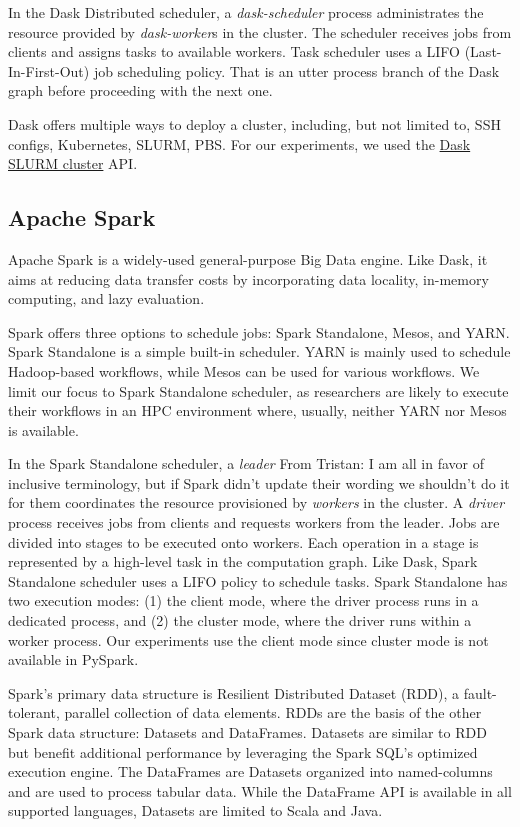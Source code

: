 \documentclass[conference]{IEEEtran}
\newcommand{\TG}[1]{\color{cyan}From Tristan: #1 \color{black}}
\begin{document}
In the Dask Distributed scheduler, a \textit{dask-scheduler} process administrates the resource provided by  \textit{dask-worker}s in the cluster.
The scheduler receives jobs from clients and assigns tasks to available workers.
Task scheduler uses a LIFO (Last-In-First-Out) job scheduling policy.
That is an utter process branch of the Dask graph before proceeding with the next one.

Dask offers multiple ways to deploy a cluster, including, but not limited to, SSH configs, Kubernetes, SLURM, PBS.
For our experiments, we used the \href{https://jobqueue.dask.org/en/latest/generated/dask_jobqueue.SLURMCluster.html}{Dask SLURM cluster} API.

\subsection{Apache Spark}
Apache Spark is a widely-used general-purpose Big Data engine.
Like Dask, it aims at reducing data transfer costs by incorporating data locality, in-memory computing, and lazy evaluation.

Spark offers three options to schedule jobs: Spark Standalone, Mesos, and YARN.
Spark Standalone is a simple built-in scheduler.
YARN is mainly used to schedule Hadoop-based workflows, while Mesos can be used for various workflows.
We limit our focus to Spark Standalone scheduler, as researchers are likely to execute their workflows in an HPC environment where, usually, neither YARN nor Mesos is available.

In the Spark Standalone scheduler, a \textit{leader} \TG{I am all in favor of inclusive terminology, but if Spark didn't update their wording we shouldn't do it for them} coordinates the resource provisioned by \textit{workers} in the cluster.
A \textit{driver}  process receives jobs from clients and requests workers from the leader.
Jobs are divided into stages to be executed onto workers.
Each operation in a stage is represented by a high-level task in the computation graph.
Like Dask, Spark Standalone scheduler uses a LIFO policy to schedule tasks.
Spark Standalone has two execution modes: (1) the client mode, where the driver process runs in a dedicated process,
and (2) the cluster mode, where the driver runs within a worker process.
Our experiments use the client mode since cluster mode is not available in PySpark.

Spark's primary data structure is Resilient Distributed Dataset (RDD)\cite{RDD}, a fault-tolerant, parallel collection of data elements.
RDDs are the basis of the other Spark data structure: Datasets and DataFrames.
Datasets are similar to RDD but benefit additional performance by leveraging the Spark SQL's optimized execution engine. 
The DataFrames are Datasets organized into named-columns and are used to process tabular data. 
While the DataFrame API is available in all supported languages, Datasets are limited to Scala and Java. 
\end{document}
